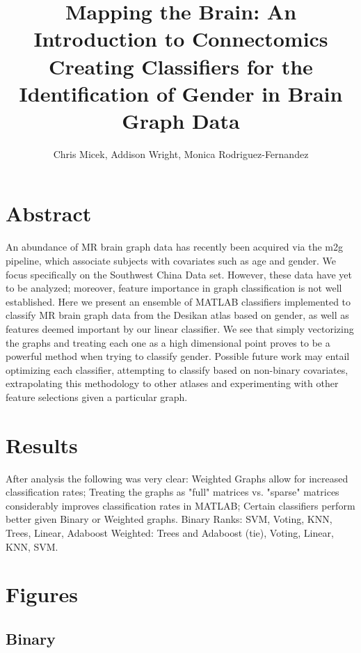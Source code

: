 \documentclass[11pt]{article} %
\title{Mapping the Brain: An Introduction to Connectomics\\Creating Classifiers for the Identification of Gender in Brain Graph Data}
\author{Chris Micek, Addison Wright, Monica Rodriguez-Fernandez}
\begin{document}
\maketitle

\section{Abstract}

An abundance of MR brain graph data has recently been acquired via the m2g pipeline, which associate subjects with covariates such as age and gender. We focus specifically on the Southwest China Data set. However, these data have yet to be analyzed; moreover, feature importance in graph classification is not well established. Here we present an ensemble of MATLAB classifiers implemented to classify MR brain graph data from the Desikan atlas based on gender, as well as features deemed important by our linear classifier. We see that simply vectorizing the graphs and treating each one as a high dimensional point proves to be a powerful method when trying to classify gender. Possible future work may entail optimizing each classifier, attempting to classify based on non-binary covariates, extrapolating this methodology to other atlases and experimenting with other feature selections given a particular graph.

\section{Results}

After analysis the following was very clear: 
Weighted Graphs allow for increased classification rates;
Treating the graphs as "full" matrices vs. "sparse" matrices considerably improves classification rates in MATLAB; 
Certain classifiers perform better given Binary or Weighted graphs. 
Binary Ranks:
SVM,
Voting,
KNN,
Trees,
Linear,
Adaboost
Weighted:
Trees and Adaboost (tie),
Voting,
Linear,
KNN,
SVM.
\newpage
\section{Figures}
\subsection{Binary}
\end{document}
